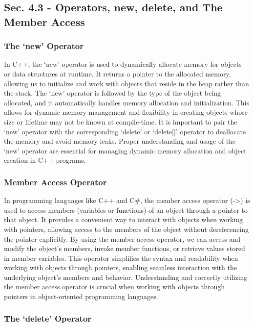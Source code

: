 \subsection*{Sec. 4.3 - Operators, new, delete, and The Member Access}

\subsubsection{The `new' Operator}

In C++, the `new' operator is used to dynamically allocate memory for objects or data structures at runtime. It returns a pointer to the allocated memory, allowing us to initialize and work with objects that reside in the heap rather than 
the stack. The `new' operator is followed by the type of the object being allocated, and it automatically handles memory allocation and initialization. This allows for dynamic memory management and flexibility in creating objects whose size 
or lifetime may not be known at compile-time. It is important to pair the `new' operator with the corresponding `delete' or `delete[]' operator to deallocate the memory and avoid memory leaks. Proper understanding and usage of the `new' 
operator are essential for managing dynamic memory allocation and object creation in C++ programs.

\subsubsection{Member Access Operator}

In programming languages like C++ and C\#, the member access operator (->) is used to access members (variables or functions) of an object through a pointer to that object. It provides a convenient way to interact with objects when working 
with pointers, allowing access to the members of the object without dereferencing the pointer explicitly. By using the member access operator, we can access and modify the object's members, invoke member functions, or retrieve values stored 
in member variables. This operator simplifies the syntax and readability when working with objects through pointers, enabling seamless interaction with the underlying object's members and behavior. Understanding and correctly utilizing the 
member access operator is crucial when working with objects through pointers in object-oriented programming languages.

\subsubsection{The `delete' Operator}

